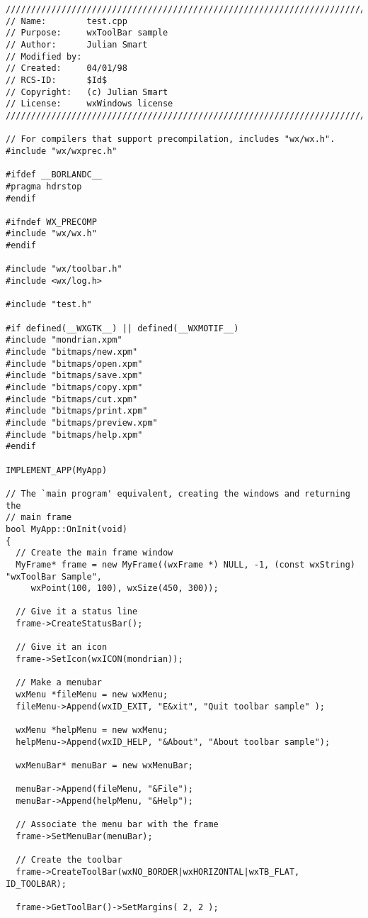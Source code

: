 {\small
\begin{verbatim}
/////////////////////////////////////////////////////////////////////////////
// Name:        test.cpp
// Purpose:     wxToolBar sample
// Author:      Julian Smart
// Modified by:
// Created:     04/01/98
// RCS-ID:      $Id$
// Copyright:   (c) Julian Smart
// License:   	wxWindows license
/////////////////////////////////////////////////////////////////////////////

// For compilers that support precompilation, includes "wx/wx.h".
#include "wx/wxprec.h"

#ifdef __BORLANDC__
#pragma hdrstop
#endif

#ifndef WX_PRECOMP
#include "wx/wx.h"
#endif

#include "wx/toolbar.h"
#include <wx/log.h>

#include "test.h"

#if defined(__WXGTK__) || defined(__WXMOTIF__)
#include "mondrian.xpm"
#include "bitmaps/new.xpm"
#include "bitmaps/open.xpm"
#include "bitmaps/save.xpm"
#include "bitmaps/copy.xpm"
#include "bitmaps/cut.xpm"
#include "bitmaps/print.xpm"
#include "bitmaps/preview.xpm"
#include "bitmaps/help.xpm"
#endif

IMPLEMENT_APP(MyApp)

// The `main program' equivalent, creating the windows and returning the
// main frame
bool MyApp::OnInit(void)
{
  // Create the main frame window
  MyFrame* frame = new MyFrame((wxFrame *) NULL, -1, (const wxString) "wxToolBar Sample",
     wxPoint(100, 100), wxSize(450, 300));

  // Give it a status line
  frame->CreateStatusBar();

  // Give it an icon
  frame->SetIcon(wxICON(mondrian));

  // Make a menubar
  wxMenu *fileMenu = new wxMenu;
  fileMenu->Append(wxID_EXIT, "E&xit", "Quit toolbar sample" );

  wxMenu *helpMenu = new wxMenu;
  helpMenu->Append(wxID_HELP, "&About", "About toolbar sample");

  wxMenuBar* menuBar = new wxMenuBar;

  menuBar->Append(fileMenu, "&File");
  menuBar->Append(helpMenu, "&Help");

  // Associate the menu bar with the frame
  frame->SetMenuBar(menuBar);

  // Create the toolbar
  frame->CreateToolBar(wxNO_BORDER|wxHORIZONTAL|wxTB_FLAT, ID_TOOLBAR);
  
  frame->GetToolBar()->SetMargins( 2, 2 );


\end{verbatim}}
